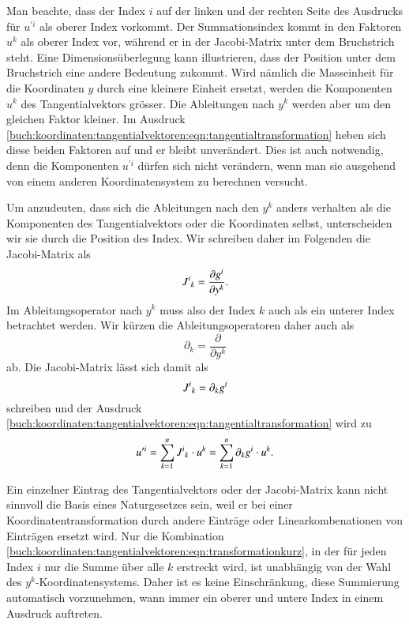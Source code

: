 Man beachte, dass der Index $i$ auf der linken und der rechten 
Seite des Ausdrucks für $u^{\prime i}$ als oberer Index vorkommt.
Der Summationsindex kommt in den Faktoren $u^k$ als oberer Index
vor, während er in der Jacobi-Matrix unter dem Bruchstrich steht.
Eine Dimensionsüberlegung kann illustrieren, dass der Position unter
dem Bruchstrich eine andere Bedeutung zukommt.
Wird nämlich die Masseinheit für die Koordinaten $y$ durch eine kleinere
Einheit ersetzt, werden die Komponenten $u^k$ des Tangentialvektors
grösser.
Die Ableitungen nach $y^k$ werden aber um den gleichen Faktor kleiner.
Im Ausdruck 
\eqref{buch:koordinaten:tangentialvektoren:eqn:tangentialtransformation}
heben sich diese beiden Faktoren auf und er bleibt unverändert.
Dies ist auch notwendig, denn die Komponenten $u^{\prime i}$ dürfen
sich nicht verändern, wenn man sie ausgehend von einem anderen
Koordinatensystem zu berechnen versucht.

Um anzudeuten, dass sich die Ableitungen nach den $y^k$ anders verhalten
als die Komponenten des Tangentialvektors oder die Koordinaten selbst,
unterscheiden wir sie durch die Position des Index.
Wir schreiben daher im Folgenden die Jacobi-Matrix als
\[
J^i\mathstrut_k
=
\frac{\partial g^i}{\partial y^k}.
\]
Im Ableitungsoperator nach $y^k$ muss also der Index $k$ auch als ein 
unterer Index betrachtet werden.
Wir kürzen die Ableitungsoperatoren daher auch als
\[
\partial_k = \frac{\partial}{\partial y^k}
\]
ab.
Die Jacobi-Matrix lässt sich damit als
\[
J^i\mathstrut_k = \partial_k g^i
\]
schreiben und der Ausdruck
\eqref{buch:koordinaten:tangentialvektoren:eqn:tangentialtransformation}
wird zu
\begin{equation}
u^{\prime i}
=
\sum_{k=1}^n J^i\mathstrut_k \cdot u^k
=
\sum_{k=1}^n \partial_kg^i\cdot u^k.
\label{buch:koordinaten:tangentialvektoren:eqn:transformationkurz}
\end{equation}

Ein einzelner Eintrag des Tangentialvektors oder der Jacobi-Matrix
kann nicht sinnvoll die Basis eines Naturgesetzes sein, weil er bei
einer Koordinatentransformation durch andere Einträge oder Linearkombenationen
von Einträgen ersetzt wird.
Nur die Kombination
\eqref{buch:koordinaten:tangentialvektoren:eqn:transformationkurz},
in der für jeden Index $i$ nur die Summe über alle $k$ erstreckt
wird, ist unabhängig von der Wahl des $y^k$-Koordinatensystems.
Daher ist es keine Einschränkung, diese Summierung automatisch
vorzunehmen, wann immer ein oberer und untere Index in einem Ausdruck
auftreten.

